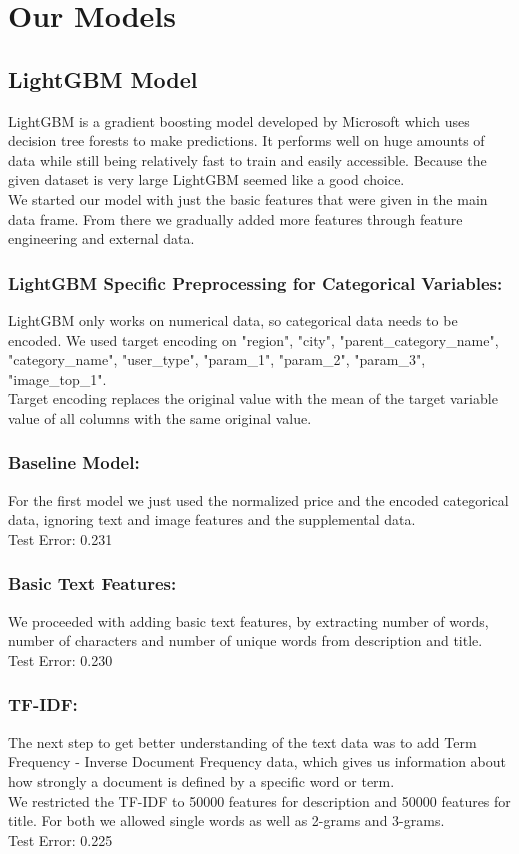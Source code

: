 \documentclass[runningheads]{llncs}
\begin{document}
\section{Our Models}
\subsection{LightGBM Model}
LightGBM is a gradient boosting model developed by Microsoft which uses decision tree forests to make predictions. It performs well on huge amounts of data while still being relatively fast to train and easily accessible. Because the given dataset is very large LightGBM seemed like a good choice. \\

We started our model with just the basic features that were given in the main data frame. From there we gradually added more features through feature engineering and external data.

\subsubsection{LightGBM Specific Preprocessing for Categorical Variables:}
LightGBM only works on numerical data, so categorical data needs to be encoded. We used target encoding on "region", "city", "parent\_category\_name", "category\_name", "user\_type", "param\_1", "param\_2", "param\_3", "image\_top\_1".\\
Target encoding replaces the original value with the mean of the target variable value of all columns with the same original value. 

\subsubsection{Baseline Model:} For the first model we just used the normalized price and the encoded categorical data, ignoring text and image features and the supplemental data. \\
Test Error: 0.231
\subsubsection{Basic Text Features:} We proceeded with adding basic text features, by extracting number of words, number of characters and number of unique words from description and title. \\
Test Error: 0.230
\subsubsection{TF-IDF:} The next step to get better understanding of the text data was to add Term Frequency - Inverse Document Frequency data, which gives us information about how strongly a document is defined by a specific word or term.\\
We restricted the TF-IDF to 50000 features for description and 50000 features for title. For both we allowed single words as well as 2-grams and 3-grams.\\
Test Error: 0.225\\
\end{document}
